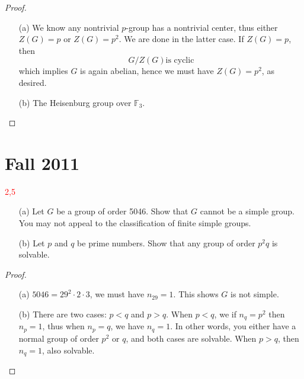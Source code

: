 \documentclass[openany]{book}
\newcommand{\F}{\mathbb{F}}
\begin{document}
\begin{proof}
    \begin{itemize}
        \item[(a)] We know any nontrivial $p$-group has a nontrivial center, thus either $Z(G)=p$ or $Z(G)=p^2$. We are done in the latter case. If $Z(G)=p$, then 
        \begin{equation*}
            G/Z(G) \text{is cyclic}
        \end{equation*}
        which implies $G$ is again abelian, hence we must have $Z(G)=p^2$, as desired.
        \item[(b)] The Heisenburg group over $\F_3$.
    \end{itemize}
\end{proof}





\chapter{Fall 2011}

\textcolor{red}{2,5}

\begin{prob}
    \begin{itemize}
        \item[(a)] Let \(G\) be a group of order 5046. Show that \(G\) cannot be a simple group. You may not appeal to the classification of finite simple groups.
        \item[(b)] Let \(p\) and \(q\) be prime numbers. Show that any group of order \(p^2q\) is solvable.
    \end{itemize}
\end{prob}
\begin{proof}
    \begin{itemize}
        \item[(a)] $5046=29^2\cdot 2\cdot 3$, we must have $n_{29}=1$. This shows $G$ is not simple.
        \item[(b)] There are two cases: $p<q$ and $p>q$. When $p<q$, we if $n_{q}=p^2$ then $n_p=1$, thus when $n_p=q$, we have $n_q=1$. In other words, you either have a normal group of order $p^2$ or $q$, and both cases are solvable. When $p>q$, then $n_q=1$, also solvable.
    \end{itemize}
\end{proof}
\end{document}
